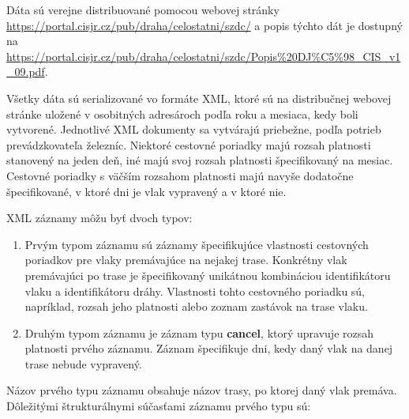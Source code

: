\documentclass[10pt,xcolor=pdflatex,dvipsnames,table,oneside]{book}
\begin{document}
\par Dáta sú verejne distribuované pomocou webovej stránky \url{https://portal.cisjr.cz/pub/draha/celostatni/szdc/} a popis týchto dát je dostupný na \url{https://portal.cisjr.cz/pub/draha/celostatni/szdc/Popis\%20DJ\%C5\%98_CIS_v1_09.pdf}. 
\par Všetky dáta sú serializované vo formáte XML, ktoré sú na distribučnej webovej stránke uložené v osobitných adresároch podľa roku a mesiaca, kedy boli vytvorené. Jednotlivé XML dokumenty sa vytvárajú priebežne, podľa potrieb prevádzkovateľa železníc. Niektoré cestovné poriadky majú rozsah platnosti stanovený na jeden deň, iné majú svoj rozsah platnosti špecifikovaný na mesiac. Cestovné poriadky s väčším rozsahom platnosti majú navyše dodatočne špecifikované, v ktoré dni je vlak vypravený a v ktoré nie.
\par XML záznamy môžu byť dvoch typov:
\begin{enumerate}
    \item Prvým typom záznamu sú záznamy špecifikujúce vlastnosti cestovných poriadkov pre vlaky premávajúce na nejakej trase. Konkrétny vlak premávajúci po trase je špecifikovaný unikátnou kombináciou identifikátoru vlaku a identifikátoru dráhy. Vlastnosti tohto cestovného poriadku sú, napríklad, rozsah jeho platnosti alebo zoznam zastávok na trase vlaku.
    \item Druhým typom záznamu je záznam typu \textbf{cancel}, ktorý upravuje rozsah platnosti prvého záznamu. Záznam špecifikuje dni, kedy daný vlak na danej trase nebude vypravený.
\end{enumerate}
\newpage
\par Názov prvého typu záznamu obsahuje názov trasy, po ktorej daný vlak premáva. Dôležitými štrukturálnymi súčasťami záznamu prvého typu sú:
\end{document}
